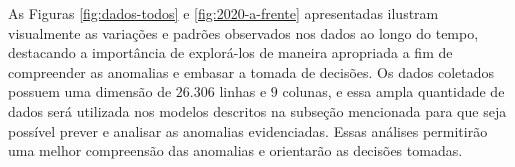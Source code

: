 As Figuras \ref{fig:dados-todos} e \ref{fig:2020-a-frente} apresentadas ilustram visualmente as variações e padrões observados nos dados ao longo do tempo, destacando a importância de explorá-los de maneira apropriada a fim de compreender as anomalias e embasar a tomada de decisões. Os dados coletados possuem uma dimensão de $26.306$ linhas e $9$ colunas, e essa ampla quantidade de dados será utilizada nos modelos descritos na subseção mencionada para que seja possível prever e analisar as anomalias evidenciadas. Essas análises permitirão uma melhor compreensão das anomalias e orientarão as decisões tomadas.






